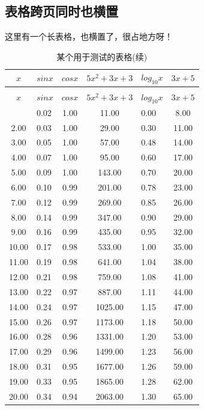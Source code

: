 \subsection{表格跨页同时也横置}
这里有一个长表格，也横置了，很占地方呀！
\begin{landscape}
		\begin{longtable}{cm{4cm}ccp{4cm}c}
		\caption{某个用于测试的表格} \label{tab4} \\
		\hline
		$x$ & $sinx$ & $cosx$ & $5x^{2}+3x+3$ & $log_{10}x$ & $3x+5$\\
		\hline
		\endfirsthead
		\caption*{某个用于测试的表格(续)}\\
		\hline
		$x$ & $sinx$ & $cosx$ & $5x^{2}+3x+3$ & $log_{10}x$ & $3x+5$\\
		\hline
		\endhead
		\hline
		\endfoot
		\hline
		\endlastfoot
		1.00 & 0.02 & 1.00 & 11.00 & 0.00 & 8.00\\
		2.00 & 0.03 & 1.00 & 29.00 & 0.30 & 11.00\\
		3.00 & 0.05 & 1.00 & 57.00 & 0.48 & 14.00\\
		4.00 & 0.07 & 1.00 & 95.00 & 0.60 & 17.00\\
		5.00 & 0.09 & 1.00 & 143.00 & 0.70 & 20.00\\
		6.00 & 0.10 & 0.99 & 201.00 & 0.78 & 23.00\\
		7.00 & 0.12 & 0.99 & 269.00 & 0.85 & 26.00\\
		8.00 & 0.14 & 0.99 & 347.00 & 0.90 & 29.00\\
		9.00 & 0.16 & 0.99 & 435.00 & 0.95 & 32.00\\
		10.00 & 0.17 & 0.98 & 533.00 & 1.00 & 35.00\\
		11.00 & 0.19 & 0.98 & 641.00 & 1.04 & 38.00\\
		12.00 & 0.21 & 0.98 & 759.00 & 1.08 & 41.00\\
		13.00 & 0.22 & 0.97 & 887.00 & 1.11 & 44.00\\
		14.00 & 0.24 & 0.97 & 1025.00 & 1.15 & 47.00\\
		15.00 & 0.26 & 0.97 & 1173.00 & 1.18 & 50.00\\
		16.00 & 0.28 & 0.96 & 1331.00 & 1.20 & 53.00\\
		17.00 & 0.29 & 0.96 & 1499.00 & 1.23 & 56.00\\
		18.00 & 0.31 & 0.95 & 1677.00 & 1.26 & 59.00\\
		19.00 & 0.33 & 0.95 & 1865.00 & 1.28 & 62.00\\
		20.00 & 0.34 & 0.94 & 2063.00 & 1.30 & 65.00\\

\end{longtable}
\end{landscape}

